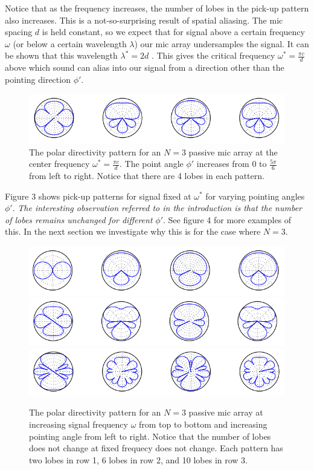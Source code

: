 \documentclass{article}
\begin{document}
Notice that as the frequency increases, the number of lobes in the pick-up pattern also increases.
This is a not-so-surprising result of spatial aliasing. The mic spacing $d$ is held constant,
so we expect that for signal above a certain frequency $\omega$ (or below a certain wavelength $\lambda$)
our mic array undersamples the signal. It can be shown that this wavelength $\lambda^{*} = 2d$ \cite{mccowan}. This
gives the critical frequency $\omega^{*} = \frac{\pi c}{d}$ above which sound can alias into our signal from a
direction other than the pointing direction $\phi'$.
\begin{figure}[ht]
  \centering
  \includegraphics[scale=0.5]{omega_money_4_lobes}
  \caption{The polar directivity pattern for an $N = 3$ passive mic array at
           the center frequency $\omega^{*} = \frac{\pi c}{d}$. The point angle $\phi'$
           increases from $0$ to $\frac{5\pi}{6}$ from left to right. Notice that
           there are 4 lobes in each pattern.}
\end{figure}

Figure 3 shows pick-up patterns for signal fixed at $\omega^{*}$ for varying pointing angles $\phi'$.
\emph{The interesting observation referred to in the introduction is
that the number of lobes remains unchanged for different} $\phi'$. See figure 4 for more examples of this.
In the next section we investigate why this is for the case where $N=3$.
\begin{figure}[H]
  \centering
  \includegraphics[scale=0.5]{omega1_2_lobes}
  \includegraphics[scale=0.5]{omega2_6_lobes}
  \includegraphics[scale=0.5]{omega3_10_lobes}
  \caption{The polar directivity pattern for an $N = 3$ passive mic array at
           increasing signal frequency $\omega$ from top to bottom and increasing
           pointing angle from left to right. Notice that the number of lobes does not
           change at fixed frequecy does not change. Each pattern has two lobes in row 1,
           6 lobes in row 2, and 10 lobes in row 3.}
\end{figure}
\end{document}

